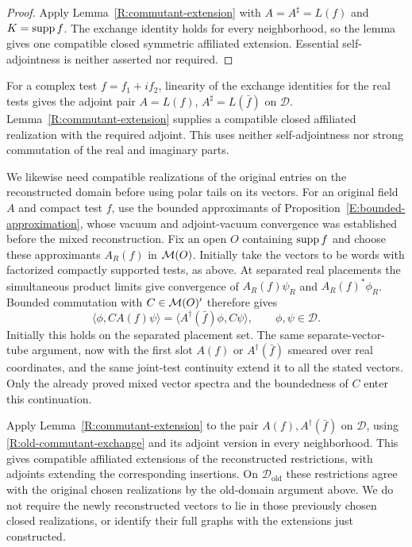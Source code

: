 \begin{proof}
Apply Lemma~\ref{R:commutant-extension} with
$A=A^\sharp=L(f)$ and $K=\operatorname{supp} f$.
The exchange identity holds for every neighborhood, so the lemma
gives one compatible closed symmetric affiliated extension.
Essential self-adjointness is neither asserted nor required.
\end{proof}

For a complex test $f=f_1+if_2$, linearity of the exchange identities
for the real tests gives the adjoint pair
$A=L(f)$, $A^\sharp=L(\bar f)$ on $\mathcal D$.
Lemma~\ref{R:commutant-extension} supplies a compatible closed
affiliated realization with the required adjoint.  This uses neither
self-adjointness nor strong commutation of the real and imaginary
parts.

We likewise need compatible realizations of the original entries on
the reconstructed domain before using polar tails on its vectors.
For an original field $A$ and compact test $f$, use the bounded
approximants of Proposition~\ref{E:bounded-approximation}, whose
vacuum and adjoint-vacuum convergence was established before the
mixed reconstruction.  Fix an open $O$ containing $\operatorname{supp} f$ and choose
these approximants $A_R(f)$ in $\mathcal M(O)$.  Initially take the vectors
to be words with factorized compactly supported tests, as above.
At separated real placements the simultaneous
product limits give convergence of $A_R(f)\psi_R$ and
$A_R(f)^*\phi_R$.  Bounded commutation with $C\in\mathcal M(O)'$ therefore
gives
\begin{equation}\label{R:old-commutant-exchange}
 \langle\phi,C A(f)\psi\rangle
   =\langle A^\dagger(\bar f)\phi,C\psi\rangle,
       \qquad \phi,\psi\in\mathcal D.
\end{equation}
Initially this holds on the separated placement set.  The same
separate-vector-tube argument, now with the first slot $A(f)$ or
$A^\dagger(\bar f)$ smeared over real coordinates, and the same
joint-test continuity
extend it to all the stated vectors.  Only the already proved mixed
vector spectra and the boundedness of $C$ enter this continuation.

Apply Lemma~\ref{R:commutant-extension} to the pair
$A(f),A^\dagger(\bar f)$ on $\mathcal D$, using
\eqref{R:old-commutant-exchange} and its adjoint version in every
neighborhood.  This gives compatible affiliated extensions of the
reconstructed restrictions, with adjoints extending the corresponding
insertions.  On $\mathcal D_{\mathrm{old}}$ these restrictions agree
with the original chosen realizations by the old-domain argument
above.  We do not require the newly reconstructed vectors to lie in
those previously chosen closed realizations, or identify their full
graphs with the extensions just constructed.

